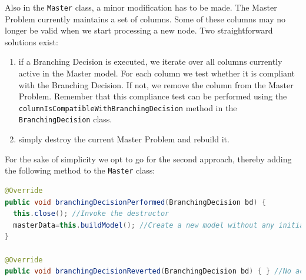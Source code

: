 \documentclass[a4paper]{article}
\newenvironment{myblock}[1]{%
    \tcolorbox[beamer,%
    noparskip,breakable,
    colback=lightBlueCodeBlock,colframe=darkBlueCodeBlock,%
    colbacklower=darkBlueCodeBlock!75!lightBlueCodeBlock,%
    coltitle=blueTitleCodeBlock,
    title=#1]}%
    {\endtcolorbox}
\newcommand{\code}[1]{\lstinline[language=java, style=seminar]!#1!}
\begin{document}
Also in the \code{Master} class, a minor modification has to be made. The Master Problem currently maintains a set of columns. Some of these columns may no longer be valid when we start processing a new node. Two straightforward solutions exist:
\begin{enumerate}
 \item if a Branching Decision is executed, we iterate over all columns currently active in the Master model. For each column we test whether it is compliant with the Branching Decision. If not, we remove the column from the Master Problem. Remember that this compliance test can be performed using the \code{columnIsCompatibleWithBranchingDecision} method in the \code{BranchingDecision} class.
 \item simply destroy the current Master Problem and rebuild it.
\end{enumerate}
For the sake of simplicity we opt to go for the second approach, thereby adding the following method to the \code{Master} class:
\begin{myblock}{Master continued}
\begin{lstlisting}[language=java, style=eclipseArticle, xleftmargin=2em]  
@Override
public void branchingDecisionPerformed(BranchingDecision bd) {
  this.close(); //Invoke the destructor
  masterData=this.buildModel(); //Create a new model without any initialColumns
}

@Override
public void branchingDecisionReverted(BranchingDecision bd) { } //No action required
\end{lstlisting}
\end{myblock}
\end{document}
